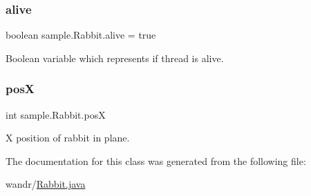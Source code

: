 \subsubsection{\texorpdfstring{alive}{alive}}
{\footnotesize\ttfamily boolean sample.\+Rabbit.\+alive = true}

Boolean variable which represents if thread is alive. \mbox{\label{classsample_1_1_rabbit_a867c7d181eeb7fb853b402d9e1c897aa}} 
\subsubsection{\texorpdfstring{posX}{posX}}
{\footnotesize\ttfamily int sample.\+Rabbit.\+posX}

X position of rabbit in plane. 

The documentation for this class was generated from the following file\+:\begin{DoxyCompactItemize}
\item 
wandr/\hyperlink{_rabbit_8java}{Rabbit.\+java}\end{DoxyCompactItemize}
